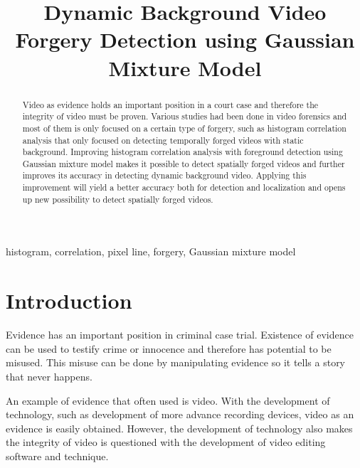 \documentclass[conference]{IEEEtran}
\begin{document}
\title{Dynamic Background Video Forgery Detection using Gaussian Mixture Model}

\author{
}


\maketitle

\begin{abstract}
Video as evidence holds an important position in a court case and therefore the integrity of video must be proven. Various studies had been done in video forensics and most of them is only focused on a certain type of forgery, such as histogram correlation analysis that only focused on detecting temporally forged videos with static background. Improving histogram correlation analysis with foreground detection using Gaussian mixture model makes it possible to detect spatially forged videos and further improves its accuracy in detecting dynamic background video. Applying this improvement will yield a better accuracy both for detection and localization and opens up new possibility to detect spatially forged videos.
\end{abstract}

\begin{IEEEkeywords}
histogram, correlation, pixel line, forgery, Gaussian mixture model
\end{IEEEkeywords}

\section{Introduction}
Evidence has an important position in criminal case trial. Existence of evidence can be used to testify crime or innocence and therefore has potential to be misused. This misuse can be done by manipulating evidence so it tells a story that never happens.

An example of evidence that often used is video. With the development of technology, such as development of more advance recording devices, video as an evidence is easily obtained. However, the development of technology also makes the integrity of video is questioned with the development of video editing software and technique.
\end{document}
